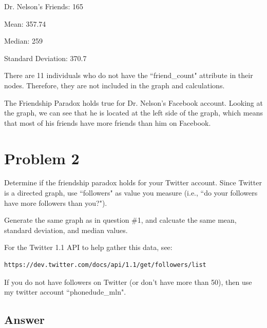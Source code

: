 \documentclass[12pt]{article}
\begin{document}
\noindent
Dr. Nelson's Friends: 165

\noindent
Mean: 357.74

\noindent
Median: 259

\noindent
Standard Deviation: 370.7

There are 11 individuals who do not have the ``friend\_count" attribute in their nodes. Therefore, they are not included in the graph and calculations.

The Friendship Paradox holds true for Dr. Nelson's Facebook account. Looking at the graph, we can see that he is located at the left side of the graph, which means that most of his friends have more friends than him on Facebook.

\section*{Problem 2}
Determine if the friendship paradox holds for your Twitter account.
Since Twitter is a directed graph, use ``followers" as value you measure
(i.e., ``do your followers have more followers than you?").

Generate the same graph as in question \#1, and calcuate the same 
mean, standard deviation, and median values.

\noindent
For the Twitter 1.1 API to help gather this data, see:

\noindent
\begin{verbatim}
https://dev.twitter.com/docs/api/1.1/get/followers/list
\end{verbatim}

If you do not have followers on Twitter (or don't have more than 50),
then use my twitter account ``phonedude\_mln".



\subsection*{Answer}
\end{document}
